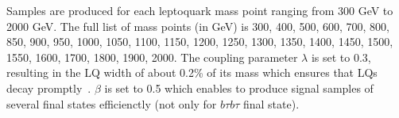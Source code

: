 Samples are produced for each leptoquark mass point ranging from 300 GeV to 2000 GeV. The full list of mass points (in GeV) is 300, 400, 500, 600, 700, 800, 850, 900, 950, 1000, 1050, 1100, 1150, 1200, 1250, 1300, 1350, 1400, 1450, 1500, 1550, 1600, 1700, 1800, 1900, 2000. The coupling parameter $\lambda$ is set to 0.3, resulting in the LQ width of about 0.2\% of its mass which ensures that LQs decay promptly~\cite{BUCHMULLER1987442, Belyaev_2005}. $\beta$ is set to 0.5 which enables to produce signal samples of several final states efficienctly (not only for $b\tau b\tau$ final state).





